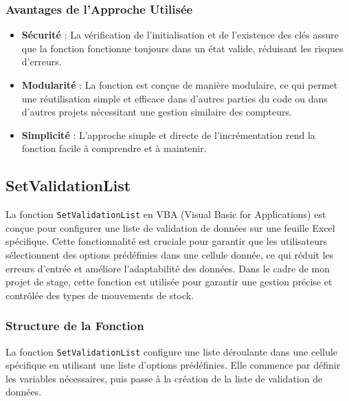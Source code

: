 \documentclass[a4paper, oneside, 12pt, final]{extreport}
\begin{document}
\subsubsection{Avantages de l'Approche Utilisée}
\begin{itemize}
    \item \textbf{Sécurité} : La vérification de l'initialisation et de l'existence des clés assure que la fonction fonctionne toujours dans un état valide, réduisant les risques d'erreurs.
    \item \textbf{Modularité} : La fonction est conçue de manière modulaire, ce qui permet une réutilisation simple et efficace dans d'autres parties du code ou dans d'autres projets nécessitant une gestion similaire des compteurs.
    \item \textbf{Simplicité} : L'approche simple et directe de l'incrémentation rend la fonction facile à comprendre et à maintenir.
\end{itemize}


\subsection{SetValidationList}
La fonction \texttt{SetValidationList} en VBA (Visual Basic for Applications) est conçue pour configurer une liste de validation de données sur une feuille Excel spécifique. Cette fonctionnalité est cruciale pour garantir que les utilisateurs sélectionnent des options prédéfinies dans une cellule donnée, ce qui réduit les erreurs d'entrée et améliore l'adaptabilité des données. Dans le cadre de mon projet de stage, cette fonction est utilisée pour garantir une gestion précise et contrôlée des types de mouvements de stock.

\subsubsection{Structure de la Fonction}
La fonction \texttt{SetValidationList} configure une liste déroulante dans une cellule spécifique en utilisant une liste d'options prédéfinies. Elle commence par définir les variables nécessaires, puis passe à la création de la liste de validation de données.
\end{document}
